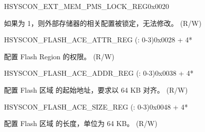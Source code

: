 \begin{register}{H}{SYSCON\_EXT\_MEM\_PMS\_LOCK\_REG}{0x0020}\label{regdesc:SYSCONEXTMEMPMSLOCKREG}
%
%
\regnewline%
\begin{regdesc}\begin{reglist}
\label{fielddesc:SYSCONEXTMEMPMSLOCK}\item [SYSCON\_EXT\_MEM\_PMS\_LOCK] 如果为 1，则外部存储器的相关配置被锁定，无法修改。 (R/W)
\end{reglist}\end{regdesc}
\end{register}


\begin{register}{H}{SYSCON\_FLASH\_ACE\_ATTR\_REG (: 0-3)}{0x0028 + 4*}\label{regdesc:SYSCONFLASHACEnATTRREG}
%
%
\regnewline%
\begin{regdesc}\begin{reglist}
\label{fielddesc:SYSCONFLASHACEnATTR}\item [SYSCON\_FLASH\_ACE\regindex{n}\_ATTR] 配置 Flash Region  的权限。 (R/W)
\end{reglist}\end{regdesc}
\end{register}


\begin{register}{H}{SYSCON\_FLASH\_ACE\_ADDR\_REG (: 0-3)}{0x0038 + 4*}\label{regdesc:SYSCONFLASHACEnADDRREG}
%
\regnewline%
\begin{regdesc}\begin{reglist}
\label{fielddesc:SYSCONFLASHACEnADDRS}\item [SYSCON\_FLASH\_ACE\regindex{n}\_ADDR\_S] 配置 Flash 区域  的起始地址，要求以 64 KB 对齐。 (R/W)
\end{reglist}\end{regdesc}
\end{register}


\begin{register}{H}{SYSCON\_FLASH\_ACE\_SIZE\_REG (: 0-3)}{0x0048 + 4*}\label{regdesc:SYSCONFLASHACEnSIZEREG}
%
%
\regnewline%
\begin{regdesc}\begin{reglist}
\label{fielddesc:SYSCONFLASHACEnSIZE}\item [SYSCON\_FLASH\_ACE\regindex{n}\_SIZE] 配置 Flash 区域  的长度，单位为 64 KB。 (R/W)
\end{reglist}\end{regdesc}
\end{register}


